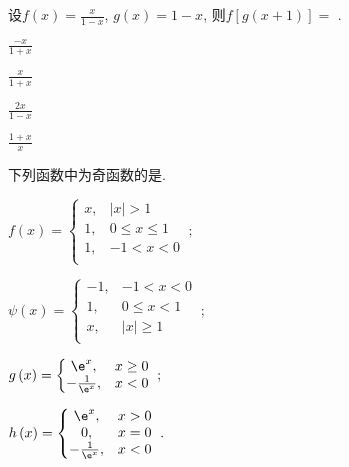 			\begin{problem}
				设$\displaystyle f\left( x \right) = \frac{x}{1 - x}$, $g\left( x \right) = 1 - x$, 则$f\left\lbrack g\left( x + 1 \right) \right\rbrack =$
				.
				
				
				\begin{abcd} \item $\displaystyle \frac{- x}{1 + x}$
					
					\item $\displaystyle \frac{x}{1 + x}$
					
					\item $\displaystyle \frac{2x}{1 - x}$
					
					\item $\displaystyle \frac{1 + x}{x}$
					
			\end{abcd}  \end{problem}
			
			\begin{problem}
				下列函数中为奇函数的是\pickin{D}.
				\begin{abcd} \item $f\left( x \right) = \left\{ \begin{matrix}
					x,&\left| x \right| > 1 \\
					1,& 0 \leq x \leq 1 \\
					1,& - 1 < x < 0 \\
					\end{matrix} \right.\ ;$
					
					
					\item $\psi\left( x \right) = \left\{ \begin{matrix}
					-1, &- 1 < x < 0 \\
					1, &0 \leq x < 1 \\
					x,& \left| x \right| \geq 1 \\
					\end{matrix} \right.\ ;$
					
					\item $g\left( x \right) = \left\{ \displaystyle \begin{matrix}
					\e^{x}, &x \geq 0 \\
					-\frac{1}{\e^{x}},& x < 0 \\
					\end{matrix} \right.\ ;$ 
					
					\item
					$h\left( x \right) = \left\{ \begin{matrix}
					\e^{x},& x > 0 \\
					0,& x = 0 \\
					-\frac{1}{\e^{x}},& x < 0 \\
					\end{matrix} \right.\ .$
					
			\end{abcd}  \end{problem}
			
